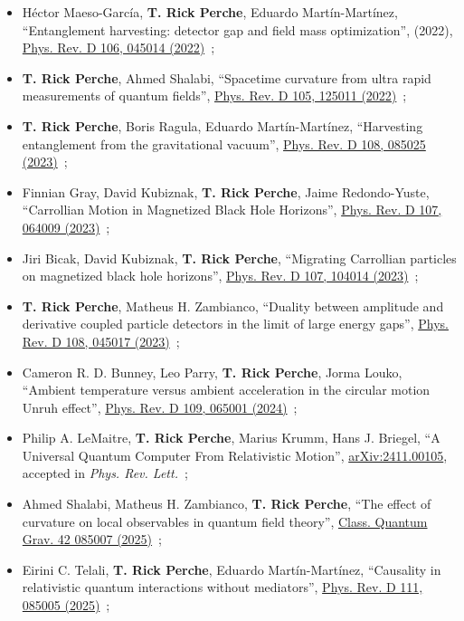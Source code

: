 \begin{itemize}
    \item[(21)] Héctor Maeso-García, \textbf{T. Rick Perche}, Eduardo Martín-Martínez, ``Entanglement harvesting: detector gap and field mass optimization'', (2022), \href{https://doi.org/10.1103/PhysRevD.106.045014}{Phys. Rev. D 106, 045014 (2022)}~\cite{hectorMass};
    \item[(22)] \textbf{T. Rick Perche}, Ahmed Shalabi, ``Spacetime curvature from ultra rapid measurements of quantum fields'', \href{https://doi.org/10.1103/PhysRevD.105.125011}{Phys. Rev. D 105, 125011 (2022)}~\cite{ahmed};
    \item[(23)] \textbf{T. Rick Perche}, Boris Ragula, Eduardo Martín-Martínez, ``Harvesting entanglement from the gravitational vacuum'', \href{https://doi.org/10.1103/PhysRevD.108.085025}{Phys. Rev. D 108, 085025 (2023)}~\cite{boris};
    \item[(24)] Finnian Gray, David Kubiznak, \textbf{T. Rick Perche}, Jaime Redondo-Yuste, ``Carrollian Motion in Magnetized Black Hole Horizons'', \href{https://doi.org/10.1103/PhysRevD.107.064009}{Phys. Rev. D 107, 064009 (2023)}~\cite{jaime};
    \item[(25)] Jiri Bicak, David Kubiznak, \textbf{T. Rick Perche}, ``Migrating Carrollian particles on magnetized black hole horizons'', \href{https://doi.org/10.1103/PhysRevD.107.104014}{Phys. Rev. D 107, 104014 (2023)}~\cite{jiri};
    \item[(26)] \textbf{T. Rick Perche}, Matheus H. Zambianco, ``Duality between amplitude and derivative coupled particle detectors in the limit of large energy gaps'', \href{https://doi.org/10.1103/PhysRevD.108.045017}{Phys. Rev. D 108, 045017 (2023)}~\cite{dualityGap};
    \item[(27)] Cameron R. D. Bunney, Leo Parry, \textbf{T. Rick Perche}, Jorma Louko, ``Ambient temperature versus ambient acceleration in the circular motion Unruh effect'', \href{https://doi.org/10.1103/PhysRevD.109.065001}{Phys. Rev. D 109, 065001 (2024)}~\cite{JormaAndI};
    \item[(28)] Philip A. LeMaitre, \textbf{T. Rick Perche}, Marius Krumm, Hans J. Briegel, ``A Universal Quantum Computer From Relativistic Motion'', \href{https://doi.org/10.48550/arXiv.2411.00105}{arXiv:2411.00105}, accepted in \textit{Phys. Rev. Lett.}~\cite{Phil};
    \item[(28)] Ahmed Shalabi, Matheus H. Zambianco, \textbf{T. Rick Perche}, ``The effect of curvature on local observables in quantum field theory'', \href{https://iopscience.iop.org/article/10.1088/1361-6382/adc534}{Class. Quantum Grav. 42 085007 (2025)}~\cite{mathahmed};
    \item[(29)] Eirini C. Telali, \textbf{T. Rick Perche}, Eduardo Martín-Martínez, ``Causality in relativistic quantum interactions without mediators'', \href{https://doi.org/10.1103/PhysRevD.111.085005}{Phys. Rev. D 111, 085005 (2025)}~\cite{eirini};
\end{itemize}

